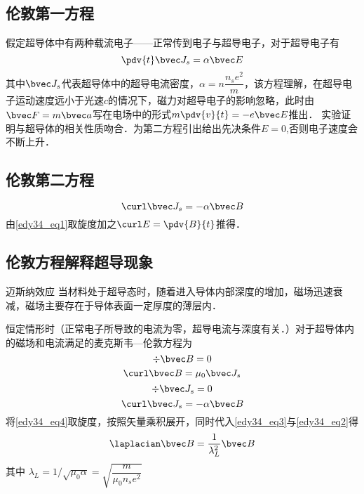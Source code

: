 \subsection{伦敦第一方程}
假定超导体中有两种载流电子——正常传到电子与超导电子，对于超导电子有
\begin{equation}
\pdv{t}\bvec J_s=\alpha\bvec E \label{edy34_eq1}
\end{equation}
其中$\bvec J_s$代表超导体中的超导电流密度，$\alpha=n\dfrac {n_se^2}m$，该方程理解，在超导电子运动速度远小于光速$c$的情况下，磁力对超导电子的影响忽略，此时由$\bvec F=m \bvec a$写在电场中的形式$m\pdv{v}{t}=-e\bvec E$推出．
实验证明与超导体的相关性质吻合．为第二方程引出给出先决条件$E=0$,否则电子速度会不断上升．
\subsection{伦敦第二方程}
\begin{equation}
\curl\bvec J_s=-\alpha\bvec B \label{edy34_eq2}
\end{equation}
由\autoref{edy34_eq1}取旋度加之$\curl E=\pdv{B}{t}$推得．
\subsection{伦敦方程解释超导现象}
\begin{theorem}{迈斯纳效应}
当材料处于超导态时，随着进入导体内部深度的增加，磁场迅速衰减，磁场主要存在于导体表面一定厚度的薄层内．
\end{theorem}
恒定情形时（正常电子所导致的电流为零，超导电流与深度有关．）对于超导体内的磁场和电流满足的麦克斯韦—伦敦方程为
\begin{equation}
\div \bvec B=0\label{edy34_eq3}
\end{equation}
\begin{equation}
\curl \bvec B=\mu_0 \bvec J_s\label{edy34_eq4}
\end{equation}
\begin{equation}
\div \bvec J_s=0\label{edy34_eq5}
\end{equation}
\begin{equation}
\curl \bvec J_s=-\alpha\bvec B
\end{equation}
将\autoref{edy34_eq4}取旋度，按照矢量乘积展开，同时代入\autoref{edy34_eq3}与\autoref{edy34_eq2}得
\begin{equation}
\laplacian \bvec B=\dfrac{1}{\lambda_L^2}\bvec B
\end{equation}
其中 $\lambda_L= 1/\sqrt{\mu_0\alpha}=\sqrt{\dfrac m {\mu_0n_se^2}}$
